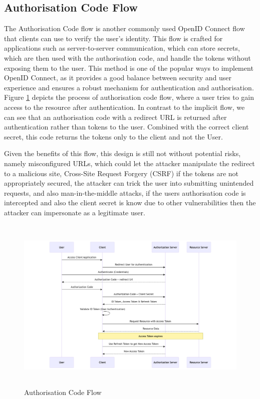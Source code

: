 \subsection{Authorisation Code Flow}
The Authorisation Code flow is another commonly used OpenID Connect flow that clients can use to verify the user's identity. This flow is crafted for applications such as server-to-server communication, which can store secrets, which are then used with the authorisation code, and handle the tokens without exposing them to the user. This method is one of the popular ways to implement OpenID Connect, as it provides a good balance between security and user experience and ensures a robust mechanism for authentication and authorisation. Figure \ref{fig:authorisation_flow} depicts the process of authorisation code flow, where a user tries to gain access to the resource after authentication. In contrast to the implicit flow, we can see that an authorisation code with a redirect URL is returned after authentication rather than tokens to the user. Combined with the correct client secret, this code returns the tokens only to the client and not the User. 

Given the benefits of this flow, this design is still not without potential risks, namely misconfigured URLs, which could let the attacker manipulate the redirect to a malicious site, Cross-Site Request Forgery (CSRF) if the tokens are not appropriately secured, the attacker can trick the user into submitting unintended requests, and also man-in-the-middle attacks, if the users authorisation code is intercepted and also the client secret is know due to other vulnerabilities then the attacker can impersonate as a legitimate user.

\begin{figure}[h!]
\centering
\caption{Authorisation Code Flow}\label{fig:authorisation_flow}
\includegraphics[width=\textwidth, height=320px]{pics/authorisation_flow.png}
\end{figure}

